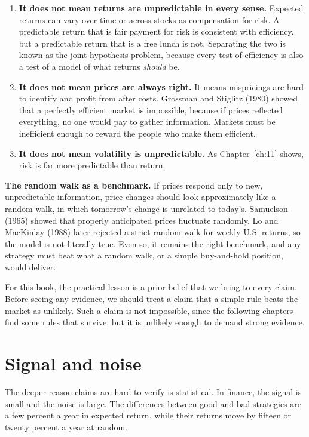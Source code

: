 \begin{enumerate}
  \item \textbf{It does not mean returns are unpredictable in every sense.} Expected returns can vary over time or across stocks as compensation for risk. A predictable return that is fair payment for risk is consistent with efficiency, but a predictable return that is a free lunch is not. Separating the two is known as the joint-hypothesis problem, because every test of efficiency is also a test of a model of what returns \emph{should} be.
  \item \textbf{It does not mean prices are always right.} It means mispricings are hard to identify and profit from after costs. Grossman and Stiglitz (1980) showed that a perfectly efficient market is impossible, because if prices reflected everything, no one would pay to gather information. Markets must be inefficient enough to reward the people who make them efficient.
  \item \textbf{It does not mean volatility is unpredictable.} As Chapter~\ref{ch:11} shows, risk is far more predictable than return.
\end{enumerate}

\textbf{The random walk as a benchmark.} If prices respond only to new, unpredictable information, price changes should look approximately like a random walk, in which tomorrow's change is unrelated to today's. Samuelson (1965) showed that properly anticipated prices fluctuate randomly. Lo and MacKinlay (1988) later rejected a strict random walk for weekly U.S. returns, so the model is not literally true. Even so, it remains the right benchmark, and any strategy must beat what a random walk, or a simple buy-and-hold position, would deliver.

For this book, the practical lesson is a prior belief that we bring to every claim. Before seeing any evidence, we should treat a claim that a simple rule beats the market as unlikely. Such a claim is not impossible, since the following chapters find some rules that survive, but it is unlikely enough to demand strong evidence.

\section{Signal and noise}
\label{sec:01-signal-noise}

The deeper reason claims are hard to verify is statistical. In finance, the signal is small and the noise is large. The differences between good and bad strategies are a few percent a year in expected return, while their returns move by fifteen or twenty percent a year at random.

